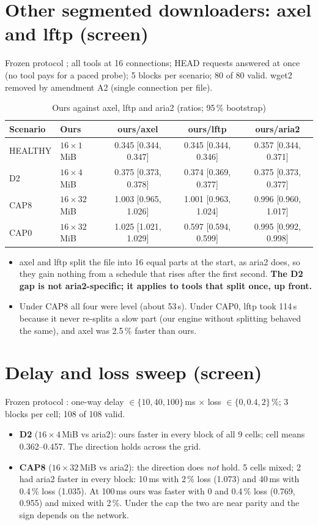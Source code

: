\section{Other segmented downloaders: axel and lftp (screen)}
Frozen protocol ; all tools at 16 connections; HEAD requests answered at once (no tool pays for a paced probe); 5 blocks per scenario; 80 of 80 valid. wget2 removed by amendment A2 (single connection per file).
\begin{table}[H]\centering\small
\caption{Ours against axel, lftp and aria2 (ratios; 95\,\% bootstrap)}\label{tab:baselines}
\begin{tabular}{@{}llccc@{}}
\toprule
\textbf{Scenario} & \textbf{Ours} & \textbf{ours/axel} & \textbf{ours/lftp} & \textbf{ours/aria2}\\
\midrule
HEALTHY & $16\times1$\,MiB & 0.345 [0.344, 0.347] & 0.345 [0.344, 0.346] & 0.357 [0.344, 0.371]\\
D2 & $16\times4$\,MiB & 0.375 [0.373, 0.378] & 0.374 [0.369, 0.377] & 0.375 [0.373, 0.377]\\
CAP8 & $16\times32$\,MiB & 1.003 [0.965, 1.026] & 1.001 [0.963, 1.024] & 0.996 [0.960, 1.017]\\
CAP0 & $16\times32$\,MiB & 1.025 [1.021, 1.029] & 0.597 [0.594, 0.599] & 0.995 [0.992, 0.998]\\
\bottomrule
\end{tabular}
\end{table}
\begin{itemize}
\item axel and lftp split the file into 16 equal parts at the start, as aria2 does, so they gain nothing from a schedule that rises after the first second. \textbf{The D2 gap is not aria2-specific; it applies to tools that split once, up front.}
\item Under CAP8 all four were level (about 53\,s). Under CAP0, lftp took 114\,s because it never re-splits a slow part (our engine without splitting behaved the same), and axel was 2.5\,\% faster than ours.
\end{itemize}

\section{Delay and loss sweep (screen)}
Frozen protocol : one-way delay $\in\{10, 40, 100\}$\,ms $\times$ loss $\in\{0, 0.4, 2\}$\,\%; 3 blocks per cell; 108 of 108 valid.
\begin{itemize}
\item \textbf{D2} ($16\times4$\,MiB vs aria2): ours faster in every block of all 9 cells; cell means 0.362--0.457. The direction holds across the grid.
\item \textbf{CAP8} ($16\times32$\,MiB vs aria2): the direction does \emph{not} hold. 5 cells mixed; 2 had aria2 faster in every block: 10\,ms with 2\,\% loss (1.073) and 40\,ms with 0.4\,\% loss (1.035). At 100\,ms ours was faster with 0 and 0.4\,\% loss (0.769, 0.955) and mixed with 2\,\%. Under the cap the two are near parity and the sign depends on the network.
\end{itemize}


